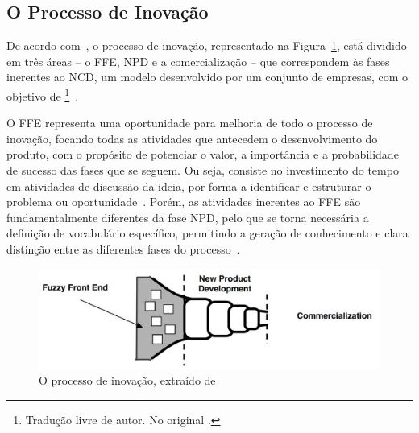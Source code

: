 \subsection{O Processo de Inovação}

De acordo com~\textcite{ffe_effectivemethods_tools_techniques}, o processo de inovação, representado na Figura~\ref{fig:inovation_process}, está dividido em três áreas -- o \gls{FFE}, \gls{NPD} e a comercialização -- que correspondem às fases inerentes ao \gls{NCD}, um modelo desenvolvido por um conjunto de empresas, com o objetivo de \footnote{Tradução livre de autor. No original .}~\parencite{providing_clarity_common_language_ffe}.

O \gls{FFE} representa uma oportunidade para melhoria de todo o processo de inovação, focando todas as atividades que antecedem o desenvolvimento do produto, com o propósito de potenciar o valor, a importância e a probabilidade de sucesso das fases que se seguem. Ou seja, consiste no investimento do tempo em atividades de discussão da ideia, por forma a identificar e estruturar o problema ou oportunidade~\parencite{ffe_effectivemethods_tools_techniques, ffe_theoretical_model}. Porém, as atividades inerentes ao \gls{FFE} são fundamentalmente diferentes da fase \gls{NPD}, pelo que se torna necessária a definição de vocabulário específico, permitindo a geração de conhecimento e clara distinção entre as diferentes fases do processo~\parencite{ffe_effectivemethods_tools_techniques}.

\begin{figure}[!ht]
    \centering
    \includegraphics[width=.95\textwidth]{ch2/assets/inovation_process.jpg}
    \caption{O processo de inovação, extraído de~\textcite{ffe_effectivemethods_tools_techniques}}
    \label{fig:inovation_process}
\end{figure}

